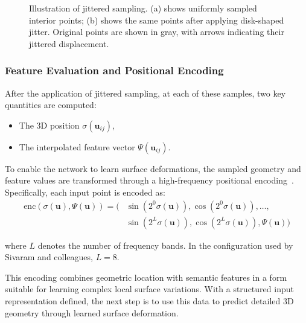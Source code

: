 \begin{figure}
\begin{adjustbox}{center}
\end{adjustbox}

\caption{Illustration of jittered sampling. (a) shows uniformly sampled interior points; (b) shows the same points after applying disk-shaped jitter. Original points are shown in gray, with arrows indicating their jittered displacement.}
\label{fig:jittered-sampling}
\end{figure}

\subsubsection{Feature Evaluation and Positional Encoding}

After the application of jittered sampling, at each of these samples, two key quantities are computed:  
\begin{itemize}
  \item The 3D position $\sigma(\mathbf{u}_{ij})$,  
  \item The interpolated feature vector $\Psi(\mathbf{u}_{ij})$.  
\end{itemize}

To enable the network to learn surface deformations, the sampled geometry and feature values are transformed through a high-frequency positional encoding~\cite{mildenhall2020}.  
Specifically, each input point is encoded as:  
\begin{equation}
\begin{aligned}
\text{enc}(\sigma(\mathbf{u}), \Psi(\mathbf{u})) = \big(&
\sin(2^0 \sigma(\mathbf{u})), \cos(2^0 \sigma(\mathbf{u})), \ldots, \\
&\sin(2^L \sigma(\mathbf{u})), \cos(2^L \sigma(\mathbf{u})), 
\Psi(\mathbf{u})
\big)
\end{aligned}
\end{equation}

where \( L \) denotes the number of frequency bands.  
In the configuration used by Sivaram and colleagues, \( L = 8 \).

This encoding combines geometric location with semantic features in a form suitable for learning complex local surface variations.  
With a structured input representation defined, the next step is to use this data to predict detailed 3D geometry through learned surface deformation.  

